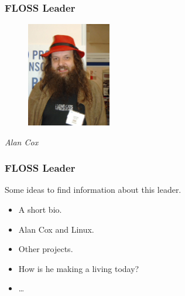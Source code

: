 \documentclass{beamer}
\begin{document}
\begin{frame}
\frametitle{FLOSS Leader}

\begin{figure}[h]
\begin{center}
  \includegraphics[height=1.80in]{figs/AlanCox.png}
\end{center}
\end{figure}

\pause

\begin{center}
{\it Alan Cox}
\end{center}

\end{frame}

\begin{frame}
\frametitle{FLOSS Leader}

Some ideas to find information about this leader.
\pause
\begin{itemize}
\item A short bio.
\item Alan Cox and Linux.
\item Other projects.
\item How is he making a living today?
\item \ldots
\end{itemize}

\end{frame}
\end{document}

